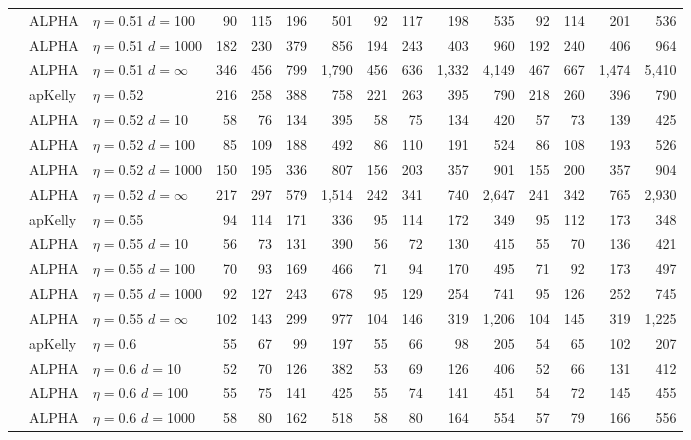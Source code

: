 \documentclass[12pt,runningheads]{llncs}
\begin{document}
{\begin{table}
\begin{tabular}{lll|rrrr|rrrr|rrrr}
& ALPHA & $\eta=$0.51 $d=$100 & 90  & 115  & 196  & 501  & 92  & 117  & 198  & 535  & 92  & 114  & 201  & 536  \\
& ALPHA & $\eta=$0.51 $d=$1000 & 182  & 230  & 379  & 856  & 194  & 243  & 403  & 960  & 192  & 240  & 406  & 964  \\
 & ALPHA & $\eta=$0.51 $d=\infty$  & 346  & 456  & 799  & 1,790  & 456  & 636  & 1,332  & 4,149  & 467  & 667  & 1,474  & 5,410  \\
\cline{2-15} & apKelly & $\eta=$0.52 & 216  & 258  & 388  & 758  & 221  & 263  & 395  & 790  & 218  & 260  & 396  & 790  \\
& ALPHA & $\eta=$0.52 $d=$10 & 58  & 76  & 134  & 395  & 58  & 75  & 134  & 420  & 57  & 73  & 139  & 425  \\
& ALPHA & $\eta=$0.52 $d=$100 & 85  & 109  & 188  & 492  & 86  & 110  & 191  & 524  & 86  & 108  & 193  & 526  \\
& ALPHA & $\eta=$0.52 $d=$1000 & 150  & 195  & 336  & 807  & 156  & 203  & 357  & 901  & 155  & 200  & 357  & 904  \\
 & ALPHA & $\eta=$0.52 $d=\infty$ & 217  & 297  & 579  & 1,514  & 242  & 341  & 740  & 2,647  & 241  & 342  & 765  & 2,930  \\
\cline{2-15} & apKelly & $\eta=$0.55 & 94  & 114  & 171  & 336  & 95  & 114  & 172  & 349  & 95  & 112  & 173  & 348  \\
& ALPHA & $\eta=$0.55 $d=$10 & 56  & 73  & 131  & 390  & 56  & 72  & 130  & 415  & 55  & 70  & 136  & 421  \\
& ALPHA & $\eta=$0.55 $d=$100 & 70  & 93  & 169  & 466  & 71  & 94  & 170  & 495  & 71  & 92  & 173  & 497  \\
& ALPHA & $\eta=$0.55 $d=$1000 & 92  & 127  & 243  & 678  & 95  & 129  & 254  & 741  & 95  & 126  & 252  & 745  \\
 & ALPHA & $\eta=$0.55 $d=\infty$  & 102  & 143  & 299  & 977  & 104  & 146  & 319  & 1,206  & 104  & 145  & 319  & 1,225  \\
\cline{2-15} & apKelly & $\eta=$0.6 & 55  & 67  & 99  & 197  & 55  & 66  & 98  & 205  & 54  & 65  & 102  & 207  \\
& ALPHA & $\eta=$0.6 $d=$10 & 52  & 70  & 126  & 382  & 53  & 69  & 126  & 406  & 52  & 66  & 131  & 412  \\
& ALPHA & $\eta=$0.6 $d=$100 & 55  & 75  & 141  & 425  & 55  & 74  & 141  & 451  & 54  & 72  & 145  & 455  \\
& ALPHA & $\eta=$0.6 $d=$1000 & 58  & 80  & 162  & 518  & 58  & 80  & 164  & 554  & 57  & 79  & 166  & 556  \\

\end{tabular}
\end{table}}
\end{document}
